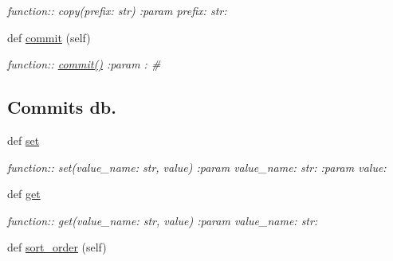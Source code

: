 \begin{DoxyCompactItemize}
\begin{DoxyCompactList}\small\item\em function\+:\+: copy(prefix\+: str) \+:param prefix\+: str\+: \end{DoxyCompactList}\item 
def \hyperlink{classplume-creator_1_1src_1_1plume_1_1data_1_1tree_1_1db__paper_1_1_db_paper_a9b3523bef4909c20d6ca6c44ff2a3695}{commit} (self)
\begin{DoxyCompactList}\small\item\em function\+:\+: \hyperlink{classplume-creator_1_1src_1_1plume_1_1data_1_1tree_1_1db__paper_1_1_db_paper_a9b3523bef4909c20d6ca6c44ff2a3695}{commit()} \+:param \+: \# \subsection*{Commits db.}\end{DoxyCompactList}\item 
def \hyperlink{classplume-creator_1_1src_1_1plume_1_1data_1_1tree_1_1db__paper_1_1_db_paper_a4d39efad3c67f5c8b628e37a5e6c35cd}{set}\hypertarget{classplume-creator_1_1src_1_1plume_1_1data_1_1tree_1_1db__paper_1_1_db_paper_a4d39efad3c67f5c8b628e37a5e6c35cd}{}\label{classplume-creator_1_1src_1_1plume_1_1data_1_1tree_1_1db__paper_1_1_db_paper_a4d39efad3c67f5c8b628e37a5e6c35cd}

\begin{DoxyCompactList}\small\item\em function\+:\+: set(value\+\_\+name\+: str, value) \+:param value\+\_\+name\+: str\+: \+:param value\+: \end{DoxyCompactList}\item 
def \hyperlink{classplume-creator_1_1src_1_1plume_1_1data_1_1tree_1_1db__paper_1_1_db_paper_abbafd660df1c0df5a56622656a79d817}{get}\hypertarget{classplume-creator_1_1src_1_1plume_1_1data_1_1tree_1_1db__paper_1_1_db_paper_abbafd660df1c0df5a56622656a79d817}{}\label{classplume-creator_1_1src_1_1plume_1_1data_1_1tree_1_1db__paper_1_1_db_paper_abbafd660df1c0df5a56622656a79d817}

\begin{DoxyCompactList}\small\item\em function\+:\+: get(value\+\_\+name\+: str, value) \+:param value\+\_\+name\+: str\+: \end{DoxyCompactList}\item 
def \hyperlink{classplume-creator_1_1src_1_1plume_1_1data_1_1tree_1_1db__paper_1_1_db_paper_a647733f56f7d19a799d4e6f91f0c51e7}{sort\+\_\+order} (self)\hypertarget{classplume-creator_1_1src_1_1plume_1_1data_1_1tree_1_1db__paper_1_1_db_paper_a647733f56f7d19a799d4e6f91f0c51e7}{}\label{classplume-creator_1_1src_1_1plume_1_1data_1_1tree_1_1db__paper_1_1_db_paper_a647733f56f7d19a799d4e6f91f0c51e7}


\end{DoxyCompactItemize}
